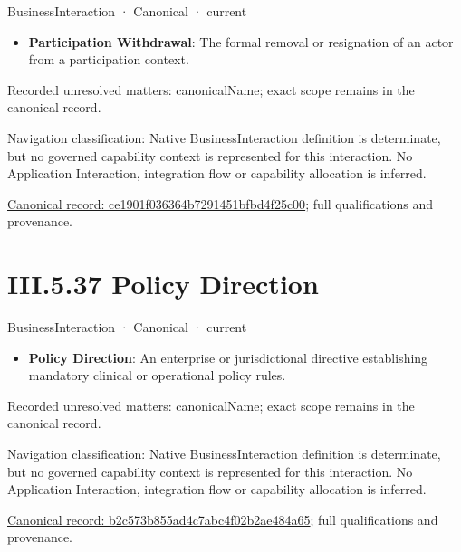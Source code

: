 \label{element:ce1901f036364b7291451bfbd4f25c00}
{\small BusinessInteraction · Canonical · current}\par

\begin{itemize}


\item \textbf{Participation Withdrawal}: The formal removal or resignation of an actor from a participation context.

\end{itemize}

{\small Recorded unresolved matters: canonicalName; exact scope remains in the canonical record.}\par
{\small Navigation classification: Native BusinessInteraction definition is determinate, but no governed capability context is represented for this interaction. No Application Interaction, integration flow or capability allocation is inferred.}\par
{\footnotesize \href{../../../../continuum/business/business-interaction/ce1901f036364b7291451bfbd4f25c00.md}{Canonical record: ce1901f036364b7291451bfbd4f25c00}; full qualifications and provenance.}\par
\section*{III.5.37 Policy Direction}
\label{navigation:III.5.37}

\label{element:b2c573b855ad4c7abc4f02b2ae484a65}
{\small BusinessInteraction · Canonical · current}\par

\begin{itemize}


\item \textbf{Policy Direction}: An enterprise or jurisdictional directive establishing mandatory clinical or operational policy rules.

\end{itemize}

{\small Recorded unresolved matters: canonicalName; exact scope remains in the canonical record.}\par
{\small Navigation classification: Native BusinessInteraction definition is determinate, but no governed capability context is represented for this interaction. No Application Interaction, integration flow or capability allocation is inferred.}\par
{\footnotesize \href{../../../../continuum/business/business-interaction/b2c573b855ad4c7abc4f02b2ae484a65.md}{Canonical record: b2c573b855ad4c7abc4f02b2ae484a65}; full qualifications and provenance.}\par
